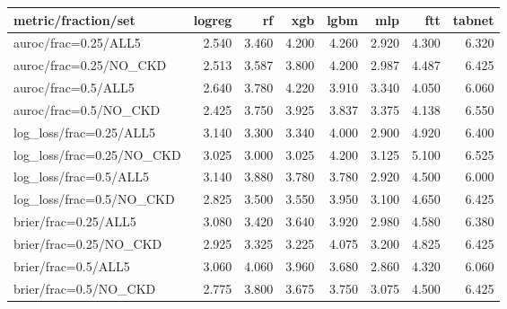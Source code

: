 \begin{tabular}{lrrrrrrr}
\toprule
metric/fraction/set & logreg & rf & xgb & lgbm & mlp & ftt & tabnet \\
\midrule
auroc/frac=0.25/ALL5 & 2.540 & 3.460 & 4.200 & 4.260 & 2.920 & 4.300 & 6.320 \\
auroc/frac=0.25/NO\_CKD & 2.513 & 3.587 & 3.800 & 4.200 & 2.987 & 4.487 & 6.425 \\
auroc/frac=0.5/ALL5 & 2.640 & 3.780 & 4.220 & 3.910 & 3.340 & 4.050 & 6.060 \\
auroc/frac=0.5/NO\_CKD & 2.425 & 3.750 & 3.925 & 3.837 & 3.375 & 4.138 & 6.550 \\
log\_loss/frac=0.25/ALL5 & 3.140 & 3.300 & 3.340 & 4.000 & 2.900 & 4.920 & 6.400 \\
log\_loss/frac=0.25/NO\_CKD & 3.025 & 3.000 & 3.025 & 4.200 & 3.125 & 5.100 & 6.525 \\
log\_loss/frac=0.5/ALL5 & 3.140 & 3.880 & 3.780 & 3.780 & 2.920 & 4.500 & 6.000 \\
log\_loss/frac=0.5/NO\_CKD & 2.825 & 3.500 & 3.550 & 3.950 & 3.100 & 4.650 & 6.425 \\
brier/frac=0.25/ALL5 & 3.080 & 3.420 & 3.640 & 3.920 & 2.980 & 4.580 & 6.380 \\
brier/frac=0.25/NO\_CKD & 2.925 & 3.325 & 3.225 & 4.075 & 3.200 & 4.825 & 6.425 \\
brier/frac=0.5/ALL5 & 3.060 & 4.060 & 3.960 & 3.680 & 2.860 & 4.320 & 6.060 \\
brier/frac=0.5/NO\_CKD & 2.775 & 3.800 & 3.675 & 3.750 & 3.075 & 4.500 & 6.425 \\
\bottomrule
\end{tabular}
